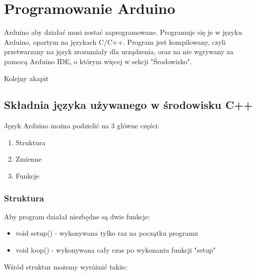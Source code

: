 
\tableofcontents 


\section{Programowanie Arduino}

Arduino aby działać musi zostać zaprogramowane. Programuje się je w języku Arduino, opartym na językach C/C++.
Program jest kompilowany, czyli przetwarzany na język zrozumiały dla urządzenia, oraz na nie wgrywany za pomocą
Arduino IDE, o którym więcej w sekcji "Środowisko". 

Kolejny akapit

\subsection {Składnia języka używanego w środowisku C++}
  Język Arduino można podzielić na 3 główne części:
  \begin{enumerate}
	\item Struktura
	\item Zmienne
	\item Funkcje
\end{enumerate}
\subsubsection  {Struktura}
	Aby program działał niezbędne są dwie funkcje:
	\renewcommand{\labelitemii}{$\circ$}
	\begin{itemize}
	
	  \item void setup() - wykonywana tylko raz na początku programu
		
	  \item void loop() - wykonywana cały czas po wykonaniu funkcji "setup"
	 
	\end{itemize}
	Wśród struktur możemy wyróżnić także:

